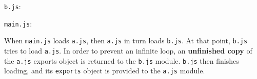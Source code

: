 \texttt{b.js}:

\begin{Shaded}
\begin{Highlighting}[]
\NormalTok{(}\NormalTok{)}\OperatorTok{;}
 \OperatorTok{=} \OperatorTok{;}
\OperatorTok{=} \NormalTok{(}\NormalTok{)}\OperatorTok{;}
\NormalTok{(}\OperatorTok{,}\NormalTok{)}\OperatorTok{;}
 \OperatorTok{=} \OperatorTok{;}
\NormalTok{(}\NormalTok{)}\OperatorTok{;}
\end{Highlighting}
\end{Shaded}

\texttt{main.js}:

\begin{Shaded}
\begin{Highlighting}[]
\NormalTok{(}\NormalTok{)}\OperatorTok{;}
\OperatorTok{=} \NormalTok{(}\NormalTok{)}\OperatorTok{;}
\OperatorTok{=} \NormalTok{(}\NormalTok{)}\OperatorTok{;}
\NormalTok{(}\OperatorTok{,}\OperatorTok{,}\NormalTok{)}\OperatorTok{;}
\end{Highlighting}
\end{Shaded}

When \texttt{main.js} loads \texttt{a.js}, then \texttt{a.js} in turn
loads \texttt{b.js}. At that point, \texttt{b.js} tries to load
\texttt{a.js}. In order to prevent an infinite loop, an
\textbf{unfinished copy} of the \texttt{a.js} exports object is returned
to the \texttt{b.js} module. \texttt{b.js} then finishes loading, and
its \texttt{exports} object is provided to the \texttt{a.js} module.

